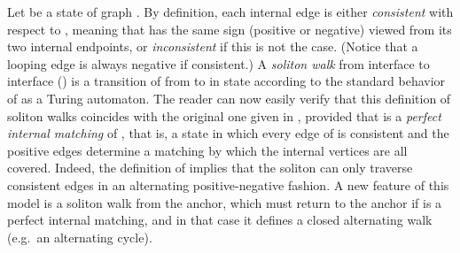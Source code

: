 \documentclass{eptcs}
\begin{document}
Let  be a state of graph . By definition, each internal edge  is either {\em consistent\/}
with respect to , meaning that  has the same sign (positive or negative) viewed from its two
internal endpoints, or {\em inconsistent\/} if this is not the case. 
(Notice that a looping edge is always negative if consistent.) A {\em soliton walk\/}
from interface  to interface  () is a transition of  from  to 
in state  according to the standard behavior of  as a Turing automaton. The 
reader can now easily verify that this definition of soliton walks coincides with the
original one given in \cite{das}, provided that  is a {\em perfect internal matching\/} 
\cite {lov,tcss}
of , that is, a state in which every edge of  is consistent and the positive edges
determine a matching by which the internal vertices are all covered. Indeed, the definition
of  implies that the soliton can only traverse consistent
edges in an alternating positive-negative fashion.  A new feature of this model is a soliton
walk from the anchor, which must return to the anchor if  is a perfect internal matching,
and in that case it defines a closed alternating walk (e.g.\ an alternating
cycle).
\end{document}
